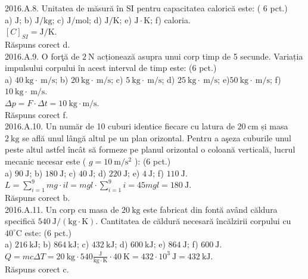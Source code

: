 2016.A.8. Unitatea de măsură în SI pentru capacitatea calorică este: ( 6 pct.)\\ a) $\mathrm{J}$; b) $\mathrm{J} / \mathrm{kg}$; c) $\mathrm{J} / \mathrm{mol}$; d) $\mathrm{J} / \mathrm{K}$; e) $\mathrm{J} \cdot \mathrm{K}$; f) caloria.\\ $[C]_{S I}=\mathrm{J} / \mathrm{K}$.\\ Răspuns corect d.\\

2016.A.9. O forţă de $2 \mathrm{~N}$ acționează asupra unui corp timp de 5 secunde. Variația impulsului corpului în acest interval de timp este: (6 pct.)\\ a) $40 \mathrm{~kg} \cdot \mathrm{~m} / \mathrm{s}$; b) $20 \mathrm{~kg} \cdot \mathrm{~m} / \mathrm{s}$; c) $5 \mathrm{~kg} \cdot \mathrm{~m} / \mathrm{s}$; d) $25 \mathrm{~kg} \cdot \mathrm{~m} / \mathrm{s}$; e)$50 \mathrm{~kg} \cdot \mathrm{~m} / \mathrm{s}$; f) $10 \mathrm{~kg} \cdot \mathrm{~m} / \mathrm{s}$.\\ $\Delta p=F \cdot \Delta t=10 \mathrm{~kg} \cdot \mathrm{m} / \mathrm{s}$.\\ Răspuns corect f.\\

2016.A.10. Un număr de 10 cuburi identice fiecare cu latura de $20 \mathrm{~cm}$ și masa $2 \mathrm{~kg}$ se află unul lângă altul pe un plan orizontal. Pentru a aşeza cuburile unul peste altul astfel încât să formeze pe planul orizontal o coloană verticală, lucrul mecanic necesar este ( $g=10 \mathrm{~m} / \mathrm{s}^{2}$ ): (6 pct.)\\ a) $90 \mathrm{~J}$; b) $180 \mathrm{~J}$; c) $40 \mathrm{~J}$; d) $220 \mathrm{~J}$; e) $4 \mathrm{~J}$; f) $110 \mathrm{~J}$.\\ $L=\sum_{i=1}^{9} m g \cdot i l=m g l \cdot \sum_{i=1}^{9} i=45 m g l=180 \mathrm{~J}$.\\ Răspuns corect b.\\

2016.A.11. Un corp cu masa de $20 \mathrm{~kg}$ este fabricat din fontă având căldura specifică $540 \mathrm{~J} /(\mathrm{kg} \cdot \mathrm{K})$. Cantitatea de căldură necesară încălzirii corpului cu $40^{\circ} \mathrm{C}$ este: (6  pct.)\\ a) $216 \mathrm{~kJ}$; b) $864 \mathrm{~kJ}$; c) $432 \mathrm{~kJ}$; d) $600 \mathrm{~kJ}$; e) $864 \mathrm{~J}$; f) $600 \mathrm{~J}$.\\ $Q=m c \Delta T=20 \mathrm{~kg} \cdot 540 \frac{\mathrm{J}}{\mathrm{kg} \cdot \mathrm{K}} \cdot 40 \mathrm{~K}=432 \cdot 10^{3} \mathrm{~J}=432 \mathrm{~kJ}$.\\ Răspuns corect c.\\

